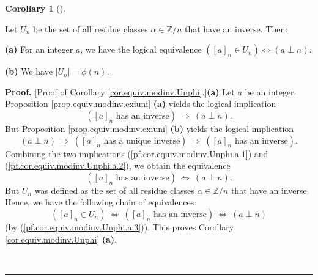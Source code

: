 \documentclass[numbers=enddot,12pt,final,onecolumn,notitlepage]{scrartcl}%
\numberwithin{exer}{subsection}
\theoremstyle{definition}
\newtheorem{coro}[theo]{Corollary}
\newenvironment{corollary}[1][]
{\begin{coro}[#1]\begin{leftbar}}
{\end{leftbar}\end{coro}}
\newenvironment{proof}[1][Proof]{\noindent\textbf{#1.} }{\ \rule{0.5em}{0.5em}}
\begin{document}
\begin{corollary}
\label{cor.equiv.modinv.Unphi}Let $U_{n}$ be the set of all residue classes
$\alpha\in\mathbb{Z}/n$ that have an inverse. Then:

\textbf{(a)} For an integer $a$, we have the logical equivalence $\left(
\left[  a\right]  _{n}\in U_{n}\right)  \Longleftrightarrow\left(  a\perp
n\right)  $.

\textbf{(b)} We have $\left\vert U_{n}\right\vert =\phi\left(  n\right)  $.
\end{corollary}

\begin{proof}
[Proof of Corollary \ref{cor.equiv.modinv.Unphi}.]\textbf{(a)} Let $a$ be an
integer. Proposition \ref{prop.equiv.modinv.exiuni} \textbf{(a)} yields the
logical implication
\begin{equation}
\left(  \left[  a\right]  _{n}\text{ has an inverse}\right)  \ \Longrightarrow
\ \left(  a\perp n\right)  . \label{pf.cor.equiv.modinv.Unphi.a.1}%
\end{equation}
But Proposition \ref{prop.equiv.modinv.exiuni} \textbf{(b)} yields the logical
implication
\begin{equation}
\left(  a\perp n\right)  \ \Longrightarrow\ \left(  \left[  a\right]
_{n}\text{ has a unique inverse}\right)  \ \Longrightarrow\ \left(  \left[
a\right]  _{n}\text{ has an inverse}\right)  .
\label{pf.cor.equiv.modinv.Unphi.a.2}%
\end{equation}
Combining the two implications (\ref{pf.cor.equiv.modinv.Unphi.a.1}) and
(\ref{pf.cor.equiv.modinv.Unphi.a.2}), we obtain the equivalence%
\begin{equation}
\left(  \left[  a\right]  _{n}\text{ has an inverse}\right)
\ \Longleftrightarrow\ \left(  a\perp n\right)  .
\label{pf.cor.equiv.modinv.Unphi.a.3}%
\end{equation}
But $U_{n}$ was defined as the set of all residue classes $\alpha\in
\mathbb{Z}/n$ that have an inverse. Hence, we have the following chain of
equivalences:%
\[
\left(  \left[  a\right]  _{n}\in U_{n}\right)  \ \Longleftrightarrow\ \left(
\left[  a\right]  _{n}\text{ has an inverse}\right)  \ \Longleftrightarrow
\ \left(  a\perp n\right)
\]
(by (\ref{pf.cor.equiv.modinv.Unphi.a.3})). This proves Corollary
\ref{cor.equiv.modinv.Unphi} \textbf{(a)}.


\end{proof}
\end{document}
